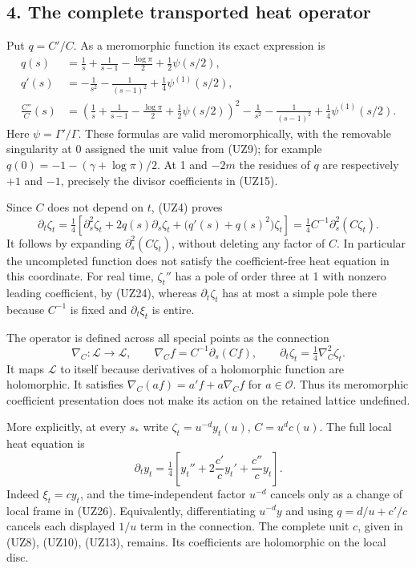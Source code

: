 \documentclass[
  10pt,
  a4paper,
]{article}
\begin{document}
\subsection{4. The complete transported heat
operator}\label{the-complete-transported-heat-operator}

Put \(q=C'/C\). As a meromorphic function its exact expression is \[
\begin{aligned}
q(s)&=\frac1s+\frac1{s-1}-\frac{\log\pi}{2}
+\frac12\psi(s/2),\\
q'(s)&=-\frac1{s^2}-\frac1{(s-1)^2}
+\frac14\psi^{(1)}(s/2),\\
\frac{C''}{C}(s)
&=\left(\frac1s+\frac1{s-1}-\frac{\log\pi}{2}
+\frac12\psi(s/2)\right)^2
-\frac1{s^2}-\frac1{(s-1)^2}
+\frac14\psi^{(1)}(s/2).
\end{aligned}\tag{UZ25}
\] Here \(\psi=\Gamma'/\Gamma\). These formulas are valid
meromorphically, with the removable singularity at 0 assigned the unit
value from (UZ9); for example \(q(0)=-1-(\gamma+\log\pi)/2\). At 1 and
\(-2m\) the residues of \(q\) are respectively \(+1\) and \(-1\),
precisely the divisor coefficients in (UZ15).

Since \(C\) does not depend on \(t\), (UZ4) proves \[
\boxed{\quad
\partial_t\zeta_t
=\tfrac14\left[
\partial_s^2\zeta_t
+2q(s)\partial_s\zeta_t
+\bigl(q'(s)+q(s)^2\bigr)\zeta_t
\right]
=\tfrac14 C^{-1}\partial_s^2(C\zeta_t).
\quad}\tag{UZ26}
\] It follows by expanding \(\partial_s^2(C\zeta_t)\), without deleting
any factor of \(C\). In particular the uncompleted function does not
satisfy the coefficient-free heat equation in this coordinate. For real
time, \(\zeta_t''\) has a pole of order three at 1 with nonzero leading
coefficient, by (UZ24), whereas \(\partial_t\zeta_t\) has at most a
simple pole there because \(C^{-1}\) is fixed and \(\partial_t\xi_t\) is
entire.

The operator is defined across all special points as the connection \[
\nabla_C:\mathcal L\to\mathcal L,\qquad
\nabla_C f=C^{-1}\partial_s(Cf),\qquad
\partial_t\zeta_t=\tfrac14\nabla_C^2\zeta_t .
\tag{UZ27}
\] It maps \(\mathcal L\) to itself because derivatives of a holomorphic
function are holomorphic. It satisfies \(\nabla_C(af)=a'f+a\nabla_C f\)
for \(a\in\mathcal O\). Thus its meromorphic coefficient presentation
does not make its action on the retained lattice undefined.

More explicitly, at every \(s_*\) write \(\zeta_t=u^{-d}y_t(u)\),
\(C=u^dc(u)\). The full local heat equation is \[
\partial_t y_t
=\tfrac14\left[y_t''+2\frac{c'}c y_t'
+\frac{c''}c y_t\right].
\tag{UZ28}
\] Indeed \(\xi_t=cy_t\), and the time-independent factor \(u^{-d}\)
cancels only as a change of local frame in (UZ26). Equivalently,
differentiating \(u^{-d}y\) and using \(q=d/u+c'/c\) cancels each
displayed \(1/u\) term in the connection. The complete unit \(c\), given
in (UZ8), (UZ10), (UZ13), remains. Its coefficients are holomorphic on
the local disc.
\end{document}
